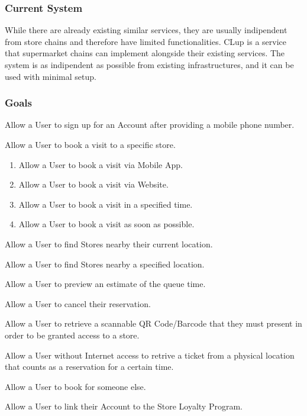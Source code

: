 \subsubsection{Current System}
While there are already existing similar services, they are usually indipendent from store chains and
therefore have limited functionalities. CLup is a service that supermarket chains can implement alongside
their existing services. The system is as indipendent as possible from existing infrastructures, and
it can be used with minimal setup.

\subsubsection{Goals}
\begin{enumerate}[label={[G\arabic*]}]
    \item Allow a User to sign up for an Account after providing a mobile phone number.
    \item Allow a User to book a visit to a specific store.
        \begin{enumerate}
            \item Allow a User to book a visit via Mobile App.
            \item Allow a User to book a visit via Website.
            \item Allow a User to book a visit in a specified time.
            \item Allow a User to book a visit as soon as possible.
        \end{enumerate}
    \item Allow a User to find Stores nearby their current location.
    \item Allow a User to find Stores nearby a specified location.
    \item Allow a User to preview an estimate of the queue time.
    \item Allow a User to cancel their reservation.
    \item Allow a User to retrieve a scannable QR Code/Barcode that they must present in order to be granted access to a store.
    \item Allow a User without Internet access to retrive a ticket from a physical location that counts as a reservation for a certain time.
    \item Allow a User to book for someone else.
    \item Allow a User to link their Account to the Store Loyalty Program.
        \begin{enumerate}

\end{enumerate}
\end{enumerate}
